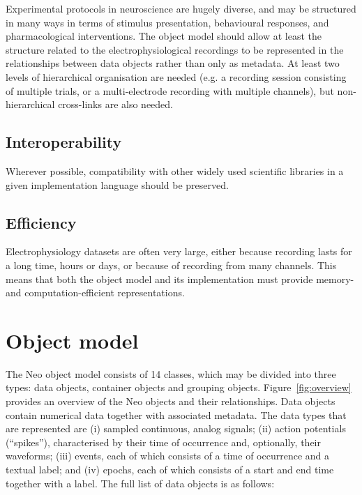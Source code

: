 \documentclass{frontiers}
\begin{document}
Experimental protocols in neuroscience are hugely diverse, and may be structured in many ways in terms of stimulus presentation, behavioural responses, and pharmacological interventions. The object model should allow at least the structure related to the electrophysiological recordings to be represented in the relationships between data objects rather than only as metadata. At least two levels of hierarchical organisation are needed (e.g. a recording session consisting of multiple trials, or a multi-electrode recording with multiple channels), but non-hierarchical cross-links are also needed.


\subsection{Interoperability}

Wherever possible, compatibility with other widely used scientific libraries in a given implementation language should be preserved.

\subsection{Efficiency}

Electrophysiology datasets are often very large, either because recording lasts for a long time, hours or days, or because of recording from many channels. This means that both the object model and its implementation must provide memory- and computation-efficient representations.


\section{Object model}


The Neo object model consists of 14 classes, which may be divided into three types: data objects, container objects and grouping objects. Figure~\ref{fig:overview} provides an overview of the Neo objects and their relationships.
Data objects contain numerical data together with associated metadata.
The data types that are represented are 
(i) sampled continuous, analog signals; 
(ii) action potentials (``spikes''), characterised by their time of occurrence and, optionally, their waveforms; 
(iii) events, each of which consists of a time of occurrence and a textual label; and 
(iv) epochs, each of which consists of a start and end time together with a label.
The full list of data objects is as follows:
\end{document}
